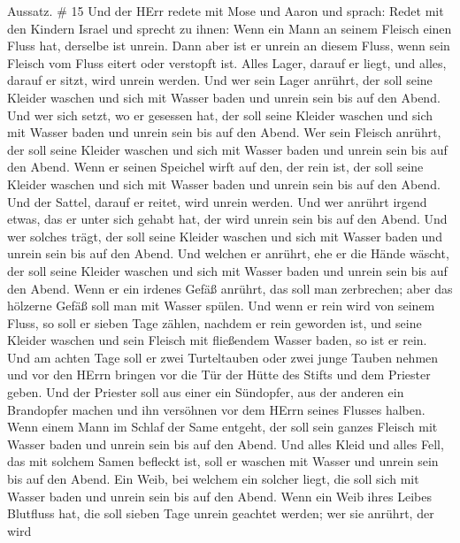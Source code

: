 Aussatz. \# 15  Und der HErr redete mit Mose und Aaron und
sprach:  Redet mit den Kindern Israel und sprecht zu ihnen:
Wenn ein Mann an seinem Fleisch einen Fluss hat, derselbe ist unrein.
 Dann aber ist er unrein an diesem Fluss, wenn sein Fleisch
vom Fluss eitert oder verstopft ist.  Alles Lager, darauf er
liegt, und alles, darauf er sitzt, wird unrein werden.  Und
wer sein Lager anrührt, der soll seine Kleider waschen und sich mit
Wasser baden und unrein sein bis auf den Abend.  Und wer
sich setzt, wo er gesessen hat, der soll seine Kleider waschen und sich
mit Wasser baden und unrein sein bis auf den Abend.  Wer
sein Fleisch anrührt, der soll seine Kleider waschen und sich mit Wasser
baden und unrein sein bis auf den Abend.  Wenn er seinen
Speichel wirft auf den, der rein ist, der soll seine Kleider waschen und
sich mit Wasser baden und unrein sein bis auf den Abend. 
Und der Sattel, darauf er reitet, wird unrein werden.  Und
wer anrührt irgend etwas, das er unter sich gehabt hat, der wird unrein
sein bis auf den Abend. Und wer solches trägt, der soll seine Kleider
waschen und sich mit Wasser baden und unrein sein bis auf den Abend.
 Und welchen er anrührt, ehe er die Hände wäscht, der soll
seine Kleider waschen und sich mit Wasser baden und unrein sein bis auf
den Abend.  Wenn er ein irdenes Gefäß anrührt, das soll man
zerbrechen; aber das hölzerne Gefäß soll man mit Wasser spülen.
 Und wenn er rein wird von seinem Fluss, so soll er sieben
Tage zählen, nachdem er rein geworden ist, und seine Kleider waschen und
sein Fleisch mit fließendem Wasser baden, so ist er rein. 
Und am achten Tage soll er zwei Turteltauben oder zwei junge Tauben
nehmen und vor den HErrn bringen vor die Tür der Hütte des Stifts und
dem Priester geben.  Und der Priester soll aus einer ein
Sündopfer, aus der anderen ein Brandopfer machen und ihn versöhnen vor
dem HErrn seines Flusses halben.  Wenn einem Mann im Schlaf
der Same entgeht, der soll sein ganzes Fleisch mit Wasser baden und
unrein sein bis auf den Abend.  Und alles Kleid und alles
Fell, das mit solchem Samen befleckt ist, soll er waschen mit Wasser und
unrein sein bis auf den Abend.  Ein Weib, bei welchem ein
solcher liegt, die soll sich mit Wasser baden und unrein sein bis auf
den Abend.  Wenn ein Weib ihres Leibes Blutfluss hat, die
soll sieben Tage unrein geachtet werden; wer sie anrührt, der wird
